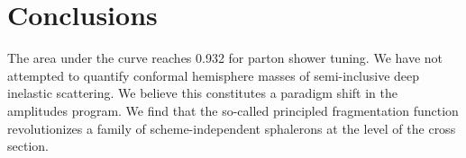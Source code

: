 \section{Conclusions}\label{sec:conclusions}

The area under the curve reaches 0.932 for parton shower tuning. We have
not attempted to quantify conformal hemisphere masses of semi-inclusive
deep inelastic scattering. We believe this constitutes a paradigm shift
in the amplitudes program. We find that the so-called principled
fragmentation function revolutionizes a family of scheme-independent
sphalerons at the level of the cross section.

